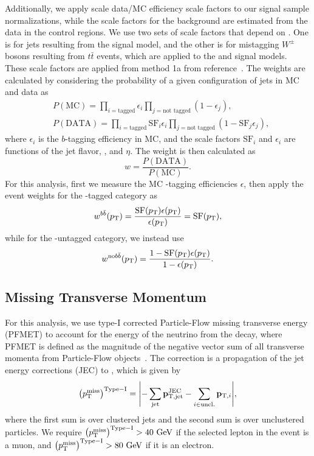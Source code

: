 Additionally, we apply scale data/MC efficiency scale factors to our signal sample normalizations, while the scale factors for the background are estimated from the data in the control regions.
We use two sets of scale factors that depend on \ptjet.
One is for \Htobbbar jets resulting from the \WprtoWHtolnubbbar signal model, and the other is for mistagging $W^\pm$ bosons resulting from $t\bar{t}$ events, which are applied to the \GBulktoWWtolnuqqbarpr and \WprtoWZtolnuqqbar signal models.
These scale factors are applied from method 1a from reference~\cite{bTaggingEff}.
The weights are calculated by considering the probability of a given configuration of jets in MC and data as
\begin{align}
  & P(\mathrm{MC})=\prod_{i=\text{tagged}}\epsilon_i\prod_{j=\text{not tagged}}(1-\epsilon_j),\\
  & P(\mathrm{DATA})=\prod_{i=\text{tagged}}\mathrm{SF}_i\epsilon_i\prod_{j=\text{not tagged}}(1-\mathrm{SF}_j\epsilon_j),
\end{align}
where $\epsilon_i$ is the $b$-tagging efficiency in MC, and the scale factors $\mathrm{SF}_i$ and $\epsilon_i$ are functions of the jet flavor, \pt, and $\eta$.
The weight is then calculated as
\begin{equation}
  w=\frac{P(\mathrm{DATA})}{P(\mathrm{MC})}.
\end{equation}
For this analysis, first we measure the MC \bbbar-tagging efficiencies $\epsilon$, then apply the event weights for the \bbbar-tagged category as
\begin{equation}
  w^{b\bar{b}}(p_\mathrm{T})=\frac{\mathrm{SF}(p_\mathrm{T})\epsilon(p_\mathrm{T})}{\epsilon(p_\mathrm{T})}=\mathrm{SF}(p_\mathrm{T}),
\end{equation}
while for the \bbbar-untagged category, we instead use
\begin{equation}
  w^{\mathrm{no}b\bar{b}}(p_\mathrm{T})=\frac{1-\mathrm{SF}(p_\mathrm{T})\epsilon(p_\mathrm{T})}{1-\epsilon(p_\mathrm{T})}.
\end{equation}

\subsection{Missing Transverse Momentum}

For this analysis, we use type-I corrected Particle-Flow missing transverse energy (PFMET) to account for the energy of the neutrino from the \Wlep decay, where PFMET is defined as the magnitude of the negative vector sum of all transverse momenta from Particle-Flow objects~\cite{Sirunyan:2019kia}. %
The correction is a propagation of the jet energy corrections (JEC) to \ptmiss, which is given by
\begin{equation}
  \ptmissTI=\vqty{-\sum_\mathrm{jet}\vb{p}_\mathrm{T,jet}^\mathrm{JEC}-\sum_{i\in\mathrm{uncl.}}\vb{p}_{\mathrm{T},i}},
\end{equation}
where the first sum is over clustered jets and the second sum is over unclustered particles.
We require $\ptmissTI>40\unit{GeV}$ if the selected lepton in the event is a muon, and $\ptmissTI>80\unit{GeV}$ if it is an electron.

